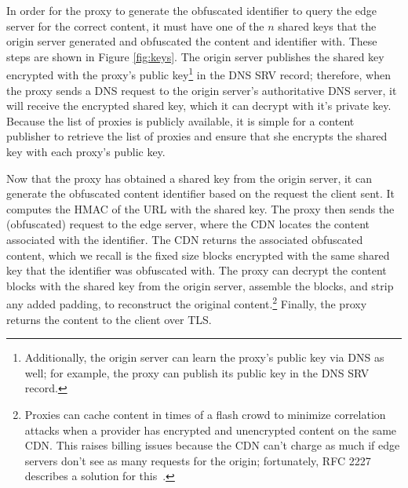 In order for the proxy to generate the obfuscated identifier to query the edge server for the correct content, 
it must have one of the $n$ shared keys that the origin server generated and obfuscated the content and identifier 
with.  These steps are shown in Figure \ref{fig:keys}.  The origin server publishes the shared key encrypted with the proxy's public key\footnote{Additionally, the origin server 
can learn the proxy's public key via DNS as well; for example, the proxy can publish its public key in the DNS SRV record.} in the DNS SRV record; therefore, 
when the proxy sends a DNS request to the origin server's authoritative DNS server, it will receive the encrypted shared 
key, which it can decrypt with it's private key.  Because the list of \system{} proxies is publicly available, it is simple for a 
content publisher to retrieve the list of proxies and ensure that she encrypts the shared key with each proxy's public key.

Now that the proxy has obtained a shared key from the origin server, it can generate the obfuscated content identifier based 
on the request the client sent.  It computes the HMAC of the URL with the shared key.  The proxy then 
sends the (obfuscated) request to the edge server, where the CDN locates the content associated with the identifier.  The CDN returns 
the associated obfuscated content, which we recall is the fixed size blocks encrypted with the same shared key that the identifier was 
obfuscated with.  The proxy can decrypt the content blocks with the shared key from the origin server, assemble the blocks, and strip any 
added padding, to reconstruct the original content.\footnote{Proxies can cache content in times of a flash crowd to minimize correlation attacks when a provider has encrypted and unencrypted content on the same CDN.  This raises billing issues because the CDN can’t charge as much if edge servers don’t see as many requests for the origin; fortunately, RFC 2227 describes a solution for this~\cite{rfc2227}.}  Finally, the proxy returns the content to the client over TLS.  

